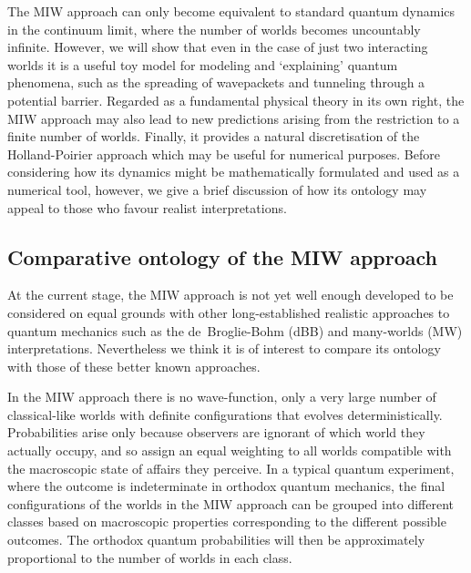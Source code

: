 \documentclass[12pt, aps,pra,amsmath,amssymb,superscriptaddress]{revtex4-2}
\renewcommand{\(}{\left(}
\renewcommand{\)}{\right)}
\newcommand{\red}{\color{red}}
\newcommand{\blk}{\color{black}}
\newcommand{\grn}{\color{ngreen}}
\renewcommand\grn{\blk}
\renewcommand\red{\blk}
\begin{document}
The MIW approach \blk can only become \blk equivalent to standard quantum
dynamics in the continuum limit, where the number of worlds becomes \blk
uncountably \blk infinite.  However, we will show that even  in  the case of just two
interacting worlds \blk it \blk is a useful toy model for modeling and
`explaining' quantum phenomena, such as the spreading of  wavepackets  and
tunneling through a potential barrier. \blk
Regarded as a fundamental physical theory
in its own right, the MIW approach may also lead to new predictions arising from
the restriction to a finite number of worlds. \red Finally, \blk it provides a natural
discretisation of the Holland-Poirier approach which may be useful for numerical
purposes. \red Before considering how its dynamics might be mathematically 
formulated and used as a numerical tool, however, we give a brief discussion of how 
its ontology may appeal to those who favour realist interpretations. \blk 


\subsection{Comparative ontology of the MIW approach} 

\grn At the current stage, the MIW approach is \red not yet well enough 
developed to be considered on equal grounds with other long-established 
realistic approaches to quantum mechanics such as  the de~Broglie-Bohm (dBB) and
many-worlds (MW) interpretations. Nevertheless we think it is  of interest \red to compare its ontology with those of these better known approaches. 
\blk 

\blk In the MIW approach \red there is no wave-function, only a very large number 
of classical-like worlds with definite configurations \blk that
evolves deterministically. Probabilities arise only because observers are
ignorant of which world they actually occupy, and so assign an equal weighting
\blk to all worlds compatible with the  macroscopic state of affairs they
perceive. In a typical quantum experiment, where the outcome is indeterminate in
orthodox quantum mechanics, the final configurations of the worlds in the MIW
approach can be grouped into different classes based on macroscopic properties
corresponding to the different possible outcomes. The orthodox quantum
probabilities will then be approximately proportional to the number of worlds in
each class. \blk 
\end{document}
